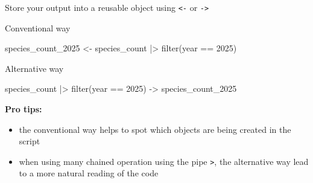 \documentclass[
  ignorenonframetext,
  aspectratio=169,
]{beamer}
\newenvironment{Shaded}{\begin{snugshade}}{\end{snugshade}}
\newcommand{\DecValTok}[1]{\textcolor[rgb]{0.68,0.00,0.00}{#1}}
\newcommand{\FunctionTok}[1]{\textcolor[rgb]{0.28,0.35,0.67}{#1}}
\newcommand{\NormalTok}[1]{\textcolor[rgb]{0.00,0.23,0.31}{#1}}
\newcommand{\OtherTok}[1]{\textcolor[rgb]{0.00,0.23,0.31}{#1}}
\newcommand{\SpecialCharTok}[1]{\textcolor[rgb]{0.37,0.37,0.37}{#1}}
\providecommand{\tightlist}{%
  \setlength{\itemsep}{0pt}\setlength{\parskip}{0pt}}
\let\oldtexttt\texttt
\renewcommand{\texttt}[1]{\colorbox{gray!20}{\oldtexttt{#1}}}
\begin{document}
\begin{frame}[fragile]{Store your output into a reusable object using
\texttt{\textless{}-} or \texttt{-\textgreater{}}}
\protect{}\label{store-your-output-into-a-reusable-object-using---or--}
\begin{block}{Conventional way}
\protect{}\label{conventional-way}
\footnotesize

\begin{Shaded}
\begin{Highlighting}[]
\NormalTok{species\_count\_2025 }\OtherTok{\textless{}{-}}\NormalTok{ species\_count }\SpecialCharTok{|\textgreater{}} \FunctionTok{filter}\NormalTok{(year }\SpecialCharTok{==} \DecValTok{2025}\NormalTok{)}
\end{Highlighting}
\end{Shaded}

\normalsize

\vspace{1em}
\end{block}

\begin{block}{Alternative way}
\protect{}\label{alternative-way}
\footnotesize

\begin{Shaded}
\begin{Highlighting}[]
\NormalTok{species\_count }\SpecialCharTok{|\textgreater{}} \FunctionTok{filter}\NormalTok{(year }\SpecialCharTok{==} \DecValTok{2025}\NormalTok{) }\OtherTok{{-}\textgreater{}}\NormalTok{ species\_count\_2025}
\end{Highlighting}
\end{Shaded}

\normalsize

\vspace{1em}

\textbf{Pro tips:}

\begin{itemize}
\tightlist
\item
  the conventional way helps to spot which objects are being created in
  the script
\item
  when using many chained operation using the pipe
  \texttt{\textbar{}\textgreater{}}, the alternative way lead to a more
  natural reading of the code
\end{itemize}
\end{block}
\end{frame}
\end{document}
